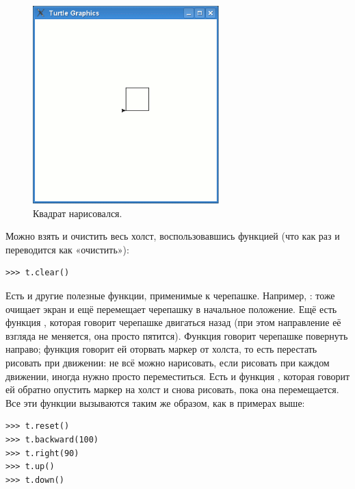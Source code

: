 \begin{figure}
\begin{center}
\includegraphics[width=72mm]{../en/figure16.eps}
\end{center}
\caption{Квадрат нарисовался.}\label{fig16}
\end{figure}

Можно взять и очистить весь холст, воспользовавшись функцией  (что как раз и переводится как «очистить»):

\begin{listing}
\begin{verbatim}
>>> t.clear()
\end{verbatim}
\end{listing}

Есть и другие полезные функции, применимые к черепашке. Например, : тоже очищает экран и ещё перемещает черепашку в начальное положение. Ещё есть функция , которая говорит черепашке двигаться назад (при этом направление её взгляда не меняется, она просто пятится). Функция  говорит черепашке повернуть направо; функция  говорит ей оторвать маркер от холста, то есть перестать рисовать при движении: не всё можно нарисовать, если рисовать при каждом движении, иногда нужно просто переместиться. Есть и функция , которая говорит ей обратно опустить маркер на холст и снова рисовать, пока она перемещается. Все эти функции вызываются таким же образом, как в примерах выше:

\begin{listing}
\begin{verbatim}
>>> t.reset()
>>> t.backward(100)
>>> t.right(90)
>>> t.up()
>>> t.down()
\end{verbatim}
\end{listing}

